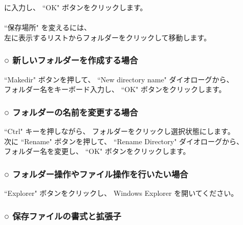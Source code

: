 \documentclass[a4paper,10pt]{article}
\begin{document}
\noindent に入力し、 “OK" ボタンをクリックします。\\
\\
“保存場所" を変えるには、\\
左に表示するリストからフォルダーをクリックして移動します。\\

\subsubsection*{○ 新しいフォルダーを作成する場合}

\noindent “Makedir" ボタンを押して、 “New directory name" ダイオローグから、\\
フォルダー名をキーボード入力し、 “OK" ボタンをクリックします。

\newpage

\noindent\vspace{0.5em}

\subsubsection*{○ フォルダーの名前を変更する場合}

\noindent “Ctrl" キーを押しながら、 フォルダーをクリックし選択状態にします。\\
次に “Rename" ボタンを押して、 “Rename Directory" ダイオローグから、\\
フォルダー名を変更し、 “OK" ボタンをクリックします。\\

\subsubsection*{○ フォルダー操作やファイル操作を行いたい場合}

\noindent “Explorer" ボタンをクリックし、 Windows Explorer を開いてください。\\

\subsubsection*{○ 保存ファイルの書式と拡張子}
\end{document}
